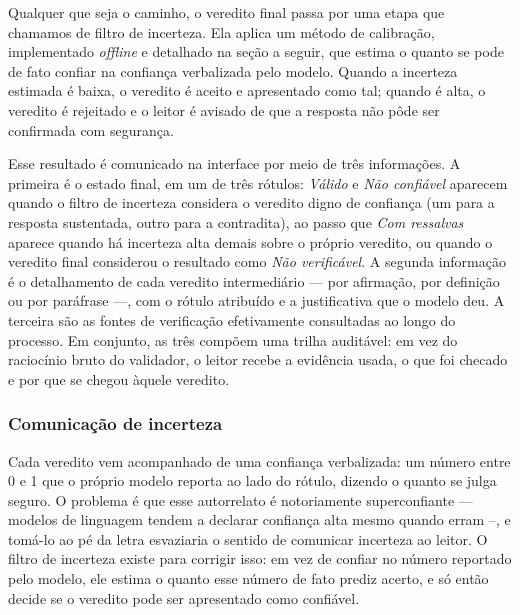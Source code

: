 Qualquer que seja o caminho, o veredito final passa por uma etapa que chamamos de filtro de incerteza. Ela aplica um método de calibração, implementado \textit{offline} e detalhado na seção a seguir, que estima o quanto se pode de fato confiar na confiança verbalizada pelo modelo. Quando a incerteza estimada é baixa, o veredito é aceito e apresentado como tal; quando é alta, o veredito é rejeitado e o leitor é avisado de que a resposta não pôde ser confirmada com segurança.

Esse resultado é comunicado na interface por meio de três informações. A primeira é o estado final, em um de três rótulos: \textit{Válido} e \textit{Não confiável} aparecem quando o filtro de incerteza considera o veredito digno de confiança (um para a resposta sustentada, outro para a contradita), ao passo que \textit{Com ressalvas} aparece quando há incerteza alta demais sobre o próprio veredito, ou quando o veredito final considerou o resultado como \textit{Não verificável}. A segunda informação é o detalhamento de cada veredito intermediário --- por afirmação, por definição ou por paráfrase ---, com o rótulo atribuído e a justificativa que o modelo deu. A terceira são as fontes de verificação efetivamente consultadas ao longo do processo. Em conjunto, as três compõem uma trilha auditável: em vez do raciocínio bruto do validador, o leitor recebe a evidência usada, o que foi checado e por que se chegou àquele veredito.



\subsubsection*{Comunicação de incerteza}
\label{subsubsec:incerteza}

Cada veredito vem acompanhado de uma confiança verbalizada: um número entre 0 e 1 que o próprio modelo reporta ao lado do rótulo, dizendo o quanto se julga seguro. O problema é que esse autorrelato é notoriamente superconfiante --- modelos de linguagem tendem a declarar confiança alta mesmo quando erram --, e tomá-lo ao pé da letra esvaziaria o sentido de comunicar incerteza ao leitor. O filtro de incerteza existe para corrigir isso: em vez de confiar no número reportado pelo modelo, ele estima o quanto esse número de fato prediz acerto, e só então decide se o veredito pode ser apresentado como confiável.


